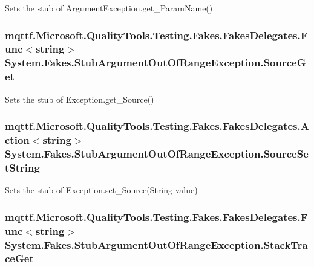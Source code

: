 Sets the stub of Argument\-Exception.\-get\-\_\-\-Param\-Name()

\hypertarget{class_system_1_1_fakes_1_1_stub_argument_out_of_range_exception_a89b38f8a8246f672bc4533fe18198d57}{
\subsubsection[{Source\-Get}]{\setlength{\rightskip}{0pt plus 5cm}mqttf.\-Microsoft.\-Quality\-Tools.\-Testing.\-Fakes.\-Fakes\-Delegates.\-Func$<$string$>$ System.\-Fakes.\-Stub\-Argument\-Out\-Of\-Range\-Exception.\-Source\-Get}}\label{class_system_1_1_fakes_1_1_stub_argument_out_of_range_exception_a89b38f8a8246f672bc4533fe18198d57}


Sets the stub of Exception.\-get\-\_\-\-Source()

\hypertarget{class_system_1_1_fakes_1_1_stub_argument_out_of_range_exception_a018adc1df6c65f83bef264d9b434ed22}{
\subsubsection[{Source\-Set\-String}]{\setlength{\rightskip}{0pt plus 5cm}mqttf.\-Microsoft.\-Quality\-Tools.\-Testing.\-Fakes.\-Fakes\-Delegates.\-Action$<$string$>$ System.\-Fakes.\-Stub\-Argument\-Out\-Of\-Range\-Exception.\-Source\-Set\-String}}\label{class_system_1_1_fakes_1_1_stub_argument_out_of_range_exception_a018adc1df6c65f83bef264d9b434ed22}


Sets the stub of Exception.\-set\-\_\-\-Source(\-String value)

\hypertarget{class_system_1_1_fakes_1_1_stub_argument_out_of_range_exception_acba11e0880f2c1d8171bf96921c57690}{
\subsubsection[{Stack\-Trace\-Get}]{\setlength{\rightskip}{0pt plus 5cm}mqttf.\-Microsoft.\-Quality\-Tools.\-Testing.\-Fakes.\-Fakes\-Delegates.\-Func$<$string$>$ System.\-Fakes.\-Stub\-Argument\-Out\-Of\-Range\-Exception.\-Stack\-Trace\-Get}}\label{class_system_1_1_fakes_1_1_stub_argument_out_of_range_exception_acba11e0880f2c1d8171bf96921c57690}


